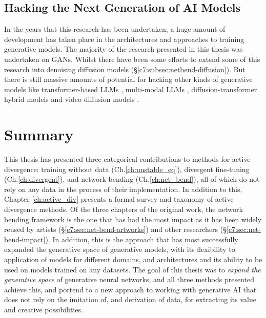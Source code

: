 \subsection{Hacking the Next Generation of AI Models}

In the years that this research has been undertaken, a huge amount of development has taken place in the architectures and approaches to training generative models.
The majority of the research presented in this thesis was undertaken on GANs.
Whilst there have been some efforts to extend some of this research into denoising diffusion models \citep{dzwonczyk2024network} (\S \ref{c7:subsec:netbend-diffusion}). 
But there is still massive amounts of potential for hacking other kinds of generative models like transformer-based LLMs \citep{vaswani2017attention}, multi-modal LLMs \citep{zhang2024mm}, diffusion-transformer hybrid models \citep{peebles2023scalable} and video diffusion models \citep{ho2022video}.

\section{Summary}

This thesis has presented three categorical contributions to methods for active divergence: training without data (Ch.\ref{ch:unstable_eq}), divergent fine-tuning  (Ch.\ref{ch:divergent}), and network bending  (Ch.\ref{ch:net_bend}), all of which do not rely on any data in the process of their implementation. 
In addition to this, Chapter \ref{ch:active_div} presents a formal survey and taxonomy of active divergence methods.
Of the three chapters of the original work, the network bending framework is the one that has had the most impact as it has been widely reused by artists  (\S \ref{c7:sec:net-bend-artworks}) and other researchers  (\S \ref{c7:sec:net-bend-impact}). 
In addition, this is the approach that has most successfully expanded the generative space of generative models, with its flexibility to application of models for different domains, and architectures and its ability to be used on models trained on any datasets.
The goal of this thesis was to \textit{expand the generative space} of generative neural networks, and all three methods presented achieve this, and portend to a new approach to working with generative AI that does not rely on the imitation of, and derivation of data, for extracting its value and creative possibilities.
